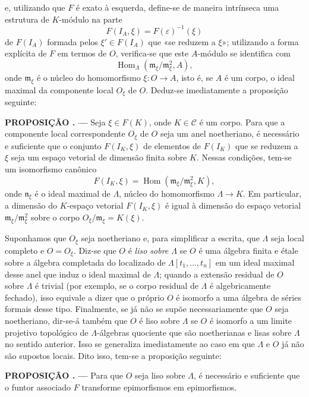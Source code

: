\documentclass[11pt,twoside,openany]{book}
\numberwithin{equation}{section}
\newcommand{\src}[1]{%
  \phantomsection\hypertarget{src:#1}{}%
  \marginpar{\raggedleft\footnotesize\sffamily #1}%
}
\theoremstyle{plain}
\theoremstyle{definition}
\theoremstyle{remark}
\newcommand{\result}[2]{%
  \par\medskip\noindent\textbf{#1%
  \if\relax\detokenize{#2}\relax\else\space#2\fi. ---}\enspace
}
\newcommand{\FgaUnitKey}{frontmatter}
\renewcommand{\src}[1]{%
  \phantomsection\hypertarget{src:\FgaUnitKey:#1}{}%
  \marginpar{\raggedleft\footnotesize\sffamily #1}%
}
\begin{document}
\src{376}
e, utilizando que $F$ é exato à esquerda, define-se de maneira
intrínseca uma estrutura de $K$-módulo na parte
\[
  F(I_A,\xi)=F(\varepsilon)^{-1}(\xi)
\]
de $F(I_A)$ formada pelos $\xi'\in F(I_A)$ que «se reduzem a $\xi$»;
utilizando a forma explícita de $F$ em termos de $O$, verifica-se que este
$A$-módulo se identifica com
\[
  \operatorname{Hom}_{\Lambda}(\mathfrak m_\xi/\mathfrak m_\xi^2,A),
\]
onde $\mathfrak m_\xi$ é o núcleo do homomorfismo
$\xi:O\longrightarrow A$, isto é, se $A$ é um corpo, o ideal maximal da
componente local $O_\xi$ de $O$. Deduz-se imediatamente a proposição
seguinte:

\result{PROPOSIÇÃO}{5.1} Seja $\xi\in F(K)$, onde $K\in\mathcal C$ é um
corpo. Para que a componente local correspondente $O_\xi$ de $O$ seja um
anel noetheriano, é necessário e suficiente que o conjunto $F(I_K,\xi)$ de
elementos de $F(I_K)$ que se reduzem a $\xi$ seja um espaço vetorial
de dimensão finita sobre $K$. Nessas condições, tem-se um isomorfismo
canônico
\[
  F(I_K,\xi)=
  \operatorname{Hom}\!\left(\mathfrak m_\xi/\mathfrak m_\xi^2,K\right),
\]
onde $\mathfrak n_\xi$ é o ideal maximal de $\Lambda$, núcleo do
homomorfismo $\Lambda\longrightarrow K$.
Em particular, a dimensão do $K$-espaço vetorial $F(I_K,\xi)$ é igual à
dimensão do espaço vetorial $\mathfrak m_\xi/\mathfrak m_\xi^2$ sobre o corpo
$O_\xi/\mathfrak m_\xi=K(\xi)$.

Suponhamos que $O_\xi$ seja noetheriano e, para simplificar a escrita, que
$\Lambda$ seja local completo e $O=O_\xi$. Diz-se que $O$ é \emph{liso sobre
$\Lambda$} se $O$ é uma álgebra finita e étale sobre a álgebra completada do
localizado de $\Lambda[t_1,\ldots,t_n]$ em um ideal maximal desse anel que
induz o ideal maximal de $\Lambda$; quando a extensão residual de $O$ sobre
$\Lambda$ é trivial (por exemplo, se o corpo residual de $\Lambda$ é
algebricamente fechado), isso equivale a dizer que o próprio $O$ é isomorfo a uma
álgebra de séries formais desse tipo.
Finalmente, se já não se supõe necessariamente que $O$ seja noetheriano, dir-se-á
também que $O$ é liso sobre $\Lambda$ se $O$ é isomorfo a um limite
projetivo topológico de $\Lambda$-álgebras quociente que são noetherianas e
lisas sobre $\Lambda$ no sentido anterior. Isso se generaliza imediatamente ao caso
em que $\Lambda$ e $O$ já não são supostos locais. Dito isso, tem-se a
proposição seguinte:

\result{PROPOSIÇÃO}{5.2} Para que $O$ seja liso sobre $\Lambda$, é necessário
e suficiente que o funtor associado $F$ transforme epimorfismos em
epimorfismos.
\end{document}
